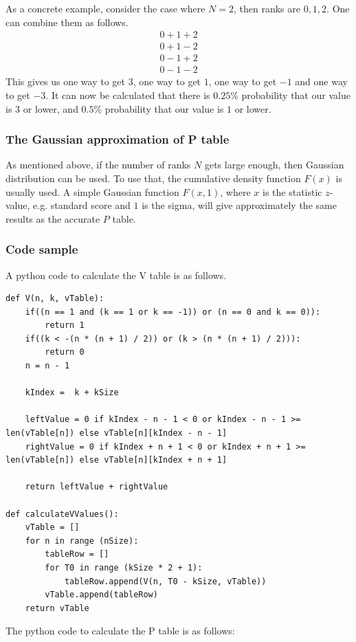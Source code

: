 \documentclass[12pt]{article}
\begin{document}
{As a concrete example, consider the case where $N=2$, then ranks are ${0, 1, 2}$. One can combine them as follows.
\begin{align*}
0 + 1 + 2 \\
0 + 1 - 2\\
0 - 1 + 2\\
0 - 1 - 2
\end{align*}
This gives us one way to get $3$, one way to get $1$, one way to get $-1$ and one way to get $-3$. It can now be calculated that there is $0.25\%$ probability that our value is $3$ or lower, and $0.5\%$ probability that our value is $1$ or lower.

\subsubsection{The Gaussian approximation of P table}
As mentioned above, if the number of ranks $N$ gets large enough, then Gaussian distribution can be used. To use that, the cumulative density function $F(x)$ is usually used. A simple Gaussian function $F(x, 1)$, where $x$ is the statistic $z$-value, e.g. standard score and $1$ is the sigma, will give approximately the same results as the accurate $P$ table.

\subsubsection{Code sample}
A python code to calculate the V table is as follows.
\begin{lstlisting}
def V(n, k, vTable):
    if((n == 1 and (k == 1 or k == -1)) or (n == 0 and k == 0)):
        return 1
    if((k < -(n * (n + 1) / 2)) or (k > (n * (n + 1) / 2))):
        return 0
    n = n - 1

    kIndex =  k + kSize

    leftValue = 0 if kIndex - n - 1 < 0 or kIndex - n - 1 >= len(vTable[n]) else vTable[n][kIndex - n - 1]
    rightValue = 0 if kIndex + n + 1 < 0 or kIndex + n + 1 >= len(vTable[n]) else vTable[n][kIndex + n + 1]

    return leftValue + rightValue

def calculateVValues():
    vTable = []
    for n in range (nSize):
        tableRow = []
        for T0 in range (kSize * 2 + 1):
            tableRow.append(V(n, T0 - kSize, vTable))
        vTable.append(tableRow)
    return vTable

\end{lstlisting}
\newpage
The python code to calculate the P table is as follows:

}
\end{document}
